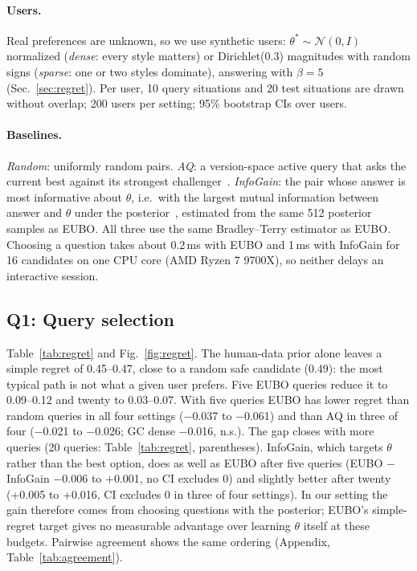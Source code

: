 \paragraph{Users.} Real preferences are unknown, so we use synthetic users: $\theta^\ast \sim \mathcal{N}(0,I)$ normalized
(\emph{dense}: every style matters) or Dirichlet(0.3) magnitudes with random signs (\emph{sparse}: one or two styles dominate),
answering with $\beta=5$ (Sec.~\ref{sec:regret}). Per user, 10 query situations and 20 test situations are drawn without overlap;
200 users per setting; 95\% bootstrap CIs over users.

\paragraph{Baselines.} \emph{Random}: uniformly random pairs. \emph{AQ}: a version-space active query that asks the current best
against its strongest challenger~\citep{padurean2025useralign}. \emph{InfoGain}: the pair whose answer is most informative about
$\theta$, i.e.\ with the largest mutual information between answer and $\theta$ under the posterior~\citep{sadigh2017active}, estimated from
the same 512 posterior samples as EUBO. All three use the same Bradley--Terry estimator as EUBO. Choosing a question takes about 0.2\,ms
with EUBO and 1\,ms with InfoGain for 16 candidates on one CPU core (AMD Ryzen 7 9700X), so neither delays an interactive session.

\subsection{Q1: Query selection}
Table~\ref{tab:regret} and Fig.~\ref{fig:regret}. The human-data prior alone leaves a simple regret of 0.45--0.47, close to a random
safe candidate (0.49): the most typical path is not what a given user prefers. Five EUBO queries reduce it to 0.09--0.12 and twenty to
0.03--0.07. With five queries EUBO has lower regret than random queries in all four settings ($-$0.037 to $-$0.061) and than AQ in three
of four ($-$0.021 to $-$0.026; GC dense $-$0.016, n.s.). The gap closes with more queries (20 queries: Table~\ref{tab:regret}, parentheses).
InfoGain, which targets $\theta$ rather than the best option, does as well as EUBO after five queries (EUBO $-$ InfoGain $-$0.006 to
+0.001, no CI excludes 0) and slightly better after twenty (+0.005 to +0.016, CI excludes 0 in three of four settings).
In our setting the gain therefore comes from choosing questions with the posterior; EUBO's simple-regret target gives no measurable
advantage over learning $\theta$ itself at these budgets.
Pairwise agreement shows the same ordering (Appendix, Table~\ref{tab:agreement}).

